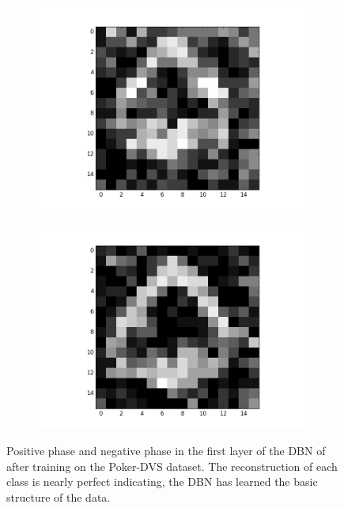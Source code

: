 \begin{figure}[h!]
\begin{subfigure}{.25\textwidth}
  		\includegraphics[width=\linewidth]{imgs/poker/recon_img6.png}
  		\label{fig:sub1}
	\end{subfigure}%
	\begin{subfigure}{.25\textwidth}
  		\centering
  		\includegraphics[width=\linewidth]{imgs/poker/recon_img8.png}
  		\label{fig:sub1}
	\end{subfigure}%
	\caption{Positive phase and negative phase in the first layer of the DBN of after training on the Poker-DVS dataset. The reconstruction of each class is nearly perfect indicating, the DBN has learned the basic structure of the data.}
	\label{fig:pokerrecon}
\end{figure}



